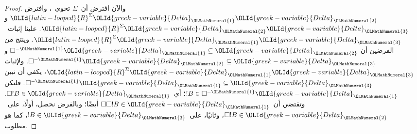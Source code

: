 \documentclass[../../../include/open-logic-section]{subfiles}
\begin{document}
\begin{proof}
  والآن افترض أن~$\Sigma$ تحوي~، وافترض
  ${\OLId{latin-looped}{R}}^\Sigma {\OLId{greek-variable}{Delta}}_{\OLMathNumeral{1}}{\OLId{greek-variable}{Delta}}_{\OLMathNumeral{2}}$ و${\OLId{latin-looped}{R}}^\Sigma {\OLId{greek-variable}{Delta}}_{\OLMathNumeral{2}}{\OLId{greek-variable}{Delta}}_{\OLMathNumeral{3}}$.
  علينا إثبات~${\OLId{latin-looped}{R}}^\Sigma {\OLId{greek-variable}{Delta}}_{\OLMathNumeral{1}}{\OLId{greek-variable}{Delta}}_{\OLMathNumeral{3}}$. وينتج من الفرضين
   أن
  $\Box^{-{\OLMathNumeral{1}}}{\OLId{greek-variable}{Delta}}_{\OLMathNumeral{1}} \subseteq {\OLId{greek-variable}{Delta}}_{\OLMathNumeral{2}}$ و
  $\Box^{-{\OLMathNumeral{1}}}{\OLId{greek-variable}{Delta}}_{\OLMathNumeral{2}} \subseteq {\OLId{greek-variable}{Delta}}_{\OLMathNumeral{3}}$. ولإثبات
  ${\OLId{latin-looped}{R}}^\Sigma {\OLId{greek-variable}{Delta}}_{\OLMathNumeral{1}}{\OLId{greek-variable}{Delta}}_{\OLMathNumeral{3}}$، يكفي أن نبين
  $\Box^{-{\OLMathNumeral{1}}}{\OLId{greek-variable}{Delta}}_{\OLMathNumeral{1}} \subseteq {\OLId{greek-variable}{Delta}}_{\OLMathNumeral{3}}$. فلتكن
  $!B \in \Box^{-{\OLMathNumeral{1}}}{\OLId{greek-variable}{Delta}}_{\OLMathNumeral{1}}$؛ أي~$\Box!B \in {\OLId{greek-variable}{Delta}}_{\OLMathNumeral{1}}$. وتقتضي
   أن~$\Box\Box!B \in {\OLId{greek-variable}{Delta}}_{\OLMathNumeral{1}}$ أيضًا؛ وبالفرض نحصل، أولًا،
  على~$\Box!B \in {\OLId{greek-variable}{Delta}}_{\OLMathNumeral{2}}$، وثانيًا، على~$!B \in {\OLId{greek-variable}{Delta}}_{\OLMathNumeral{3}}$، كما هو
  مطلوب.


\end{proof}
\end{document}
